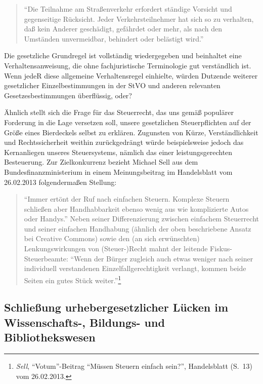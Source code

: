 \documentclass[output=paper]{langscibook}
\begin{document}
\pagebreak

\begin{quote}
\enquote{Die Teilnahme am Straßenverkehr erfordert ständige Vorsicht und
gegenseitige Rücksicht. Jeder Verkehrsteilnehmer hat sich so zu
verhalten, daß kein Anderer geschädigt, gefährdet oder mehr, als nach
den Umständen unvermeidbar, behindert oder belästigt wird.}
\end{quote}

\noindent Die gesetzliche Grundregel ist vollständig wiedergegeben und beinhaltet
eine Verhaltensanweisung, die ohne fachjuristische Terminologie gut
verständlich ist. Wenn jedeR diese allgemeine Verhaltensregel einhielte,
würden Dutzende weiterer gesetzlicher Einzelbestimmungen in der StVO und
anderen relevanten Gesetzesbestimmungen überflüssig, oder?

Ähnlich stellt sich die Frage für das Steuerrecht, das uns gemäß
populärer Forderung in die Lage versetzen soll, unsere gesetzlichen
Steuerpflichten auf der Größe eines Bierdeckels selbst zu erklären.
Zugunsten von Kürze, Verständlichkeit und Rechtssicherheit weithin
zurückgedrängt würde beispielsweise jedoch das Kernanliegen unseres
Steuersystems, nämlich das einer leistungsgerechten Besteuerung. Zur
Zielkonkurrenz bezieht Michael Sell aus dem Bundesfinanzministerium in
einem Meinungsbeitrag im Handelsblatt vom 26.02.2013 folgendermaßen
Stellung:

\begin{quote}
\enquote{Immer ertönt der Ruf nach einfachen Steuern. Komplexe Steuern
schließen aber Handhabbarkeit ebenso wenig aus wie komplizierte Autos
oder Handys.} Neben seiner Differenzierung zwischen einfachem
Steuerrecht und seiner einfachen Handhabung (ähnlich der oben
beschriebene Ansatz bei Creative Commons) sowie den (an sich
erwünschten) Lenkungswirkungen von (Steuer-)Recht mahnt der leitende
Fiskus-Steuerbeamte: \enquote{Wenn der Bürger zugleich auch etwas
weniger nach seiner individuell verstandenen Einzelfallgerechtigkeit
verlangt, kommen beide Seiten ein gutes Stück weiter.}\footnote{\emph{Sell},
  \enquote{Votum}-Beitrag \enquote{Müssen Steuern einfach sein?},
  Handelsblatt (S.~13) vom 26.02.2013.}
\end{quote}

\hypertarget{schlieuxdfung-urhebergesetzlicher-luxfccken-im-wissenschafts--bildungs--und-bibliothekswesen}{%
\subsection{Schließung urhebergesetzlicher Lücken im Wissenschafts-,
Bildungs- und
Bibliothekswesen}\label{schlieuxdfung-urhebergesetzlicher-luxfccken-im-wissenschafts--bildungs--und-bibliothekswesen}}
\end{document}
